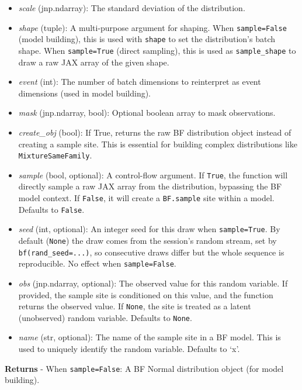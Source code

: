 \documentclass[
  letterpaper,
  DIV=11,
  numbers=noendperiod]{scrartcl}
\begin{document}
\begin{itemize}
\item
  \emph{scale} (jnp.ndarray): The standard deviation of the
  distribution.
\item
  \emph{shape} (tuple): A multi-purpose argument for shaping. When
  \texttt{sample=False} (model building), this is used with
  \texttt{shape} to set the distribution's batch shape. When
  \texttt{sample=True} (direct sampling), this is used as
  \texttt{sample\_shape} to draw a raw JAX array of the given shape.
\item
  \emph{event} (int): The number of batch dimensions to reinterpret as
  event dimensions (used in model building).
\item
  \emph{mask} (jnp.ndarray, bool): Optional boolean array to mask
  observations.
\item
  \emph{create\_obj} (bool): If True, returns the raw BF distribution
  object instead of creating a sample site. This is essential for
  building complex distributions like \texttt{MixtureSameFamily}.
\item
  \emph{sample} (bool, optional): A control-flow argument. If
  \texttt{True}, the function will directly sample a raw JAX array from
  the distribution, bypassing the BF model context. If \texttt{False},
  it will create a \texttt{BF.sample} site within a model. Defaults to
  \texttt{False}.
\item
  \emph{seed} (int, optional): An integer seed for this draw when
  \texttt{sample=True}. By default (\texttt{None}) the draw comes from
  the session's random stream, set by \texttt{bf(rand\_seed=...)}, so
  consecutive draws differ but the whole sequence is reproducible. No
  effect when \texttt{sample=False}.
\item
  \emph{obs} (jnp.ndarray, optional): The observed value for this random
  variable. If provided, the sample site is conditioned on this value,
  and the function returns the observed value. If \texttt{None}, the
  site is treated as a latent (unobserved) random variable. Defaults to
  \texttt{None}.
\item
  \emph{name} (str, optional): The name of the sample site in a BF
  model. This is used to uniquely identify the random variable. Defaults
  to `x'.
\end{itemize}

\textbf{Returns} - When \texttt{sample=False}: A BF Normal distribution
object (for model building).
\end{document}
